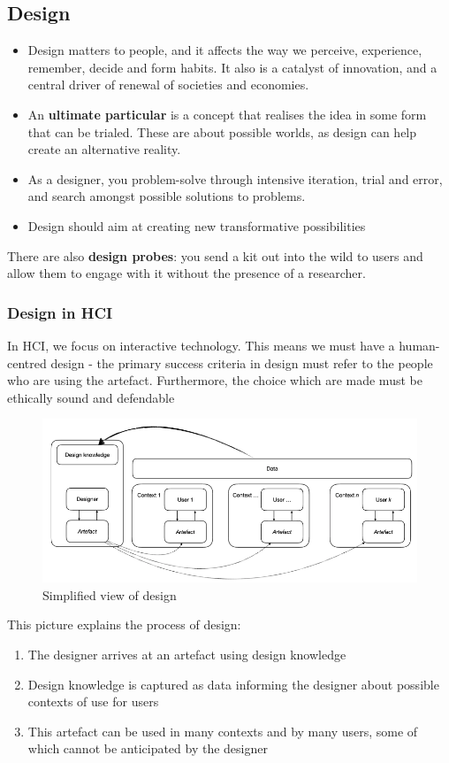 \documentclass{article}
\begin{document}
\subsection{Design}
\begin{itemize}
    \item Design matters to people, and it affects the way we perceive, experience, remember, decide and form habits. It also is a catalyst of innovation, and a central driver of renewal of societies and economies.
    \item An \textbf{ultimate particular} is a concept that realises the idea in some form that can be trialed. These are about possible worlds, as design can help create an alternative reality. 
    \item As a designer, you problem-solve through intensive iteration, trial and error, and search amongst possible solutions to problems. 
    \item Design should aim at creating new transformative possibilities
\end{itemize}
There are also \textbf{design probes}: you send a kit out into the wild to users and allow them to engage with it without the presence of a researcher.
\subsubsection*{Design in HCI}
In HCI, we focus on interactive technology. This means we must have a human-centred design - the primary success criteria in design must refer to the people who are using the artefact. Furthermore, the choice which are made must be ethically sound and defendable
\begin{figure}[H]
    \centering
    \includegraphics[width=0.8\linewidth]{Pictures/Screenshot 2023-03-08 at 12.10.30.png}
    \caption{Simplified view of design}
\end{figure}
This picture explains the process of design:
\begin{enumerate}
    \item The designer arrives at an artefact using design knowledge
    \item Design knowledge is captured as data informing the designer about possible contexts of use for users
    \item This artefact can be used in many contexts and by many users, some of which cannot be anticipated by the designer
\end{enumerate}
\end{document}
